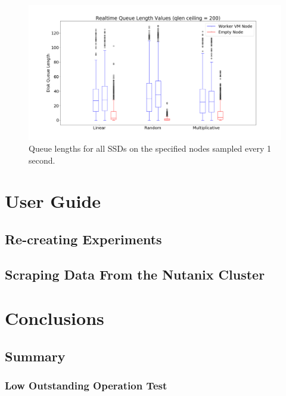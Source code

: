 \documentclass[12pt]{article}
\begin{document}
  \begin{figure}[!htb]
    \centering
    \includegraphics[scale=0.30]{images/qlen_200_box.png} 
    \caption{Queue lengths for all SSDs on the specified nodes sampled every 1
             second.}
    \label{fig:qlen_200}
  \end{figure}

\section{User Guide}


  \subsection{Re-creating Experiments}


  \subsection{Scraping Data From the Nutanix Cluster}

\section{Conclusions}


  \subsection{Summary}


    \subsubsection{Low Outstanding Operation Test}
\end{document}
